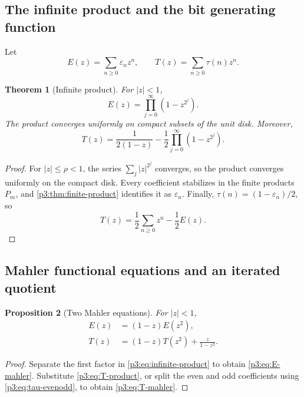 \documentclass[11pt,oneside]{article}
\newtheorem{theorem}{Theorem}[section]
\newtheorem{proposition}[theorem]{Proposition}
\theoremstyle{definition}
\theoremstyle{remark}
\newcommand{\eps}{\varepsilon}
\newcommand{\1}{\mathbf 1}
\begin{document}
\subsection{The infinite product and the bit generating function}

Let
\begin{equation}
 E(z)=\sum_{n\ge0}\eps_nz^n,
 \qquad
 T(z)=\sum_{n\ge0}\tau(n)z^n.
 \label{p3:eq:E-T-def}
\end{equation}

\begin{theorem}[Infinite product]
\label{p3:thm:infinite-product}
For \(|z|<1\),
\begin{equation}
 \boxed{
 E(z)=\prod_{j=0}^{\infty}(1-z^{2^j}).}
 \label{p3:eq:infinite-product}
\end{equation}
The product converges uniformly on compact subsets of the unit disk.  Moreover,
\begin{equation}
 \boxed{
 T(z)=\frac{1}{2(1-z)}-\frac12\prod_{j=0}^{\infty}(1-z^{2^j}).}
 \label{p3:eq:T-product}
\end{equation}
\end{theorem}

\begin{proof}
For \(|z|\le\rho<1\), the series \(\sum_j|z|^{2^j}\) converges, so the product converges
uniformly on the compact disk.  Every coefficient stabilizes in the finite products
\(P_m\), and \cref{p3:thm:finite-product} identifies it as \(\eps_n\).  Finally,
\(\tau(n)=(1-\eps_n)/2\), so
\[
 T(z)=\frac12\sum_{n\ge0}z^n-\frac12E(z).
\]
\end{proof}

\subsection{Mahler functional equations and an iterated quotient}

\begin{proposition}[Two Mahler equations]
\label{p3:prop:mahler}
For \(|z|<1\),
\begin{align}
 E(z)&=(1-z)E(z^2),                                      \label{p3:eq:E-mahler}\\
 T(z)&=(1-z)T(z^2)+\frac{z}{1-z^2}.                      \label{p3:eq:T-mahler}
\end{align}
\end{proposition}

\begin{proof}
Separate the first factor in \eqref{p3:eq:infinite-product} to obtain
\eqref{p3:eq:E-mahler}.  Substitute \eqref{p3:eq:T-product}, or split the even and odd
coefficients using \eqref{p3:eq:tau-evenodd}, to obtain \eqref{p3:eq:T-mahler}.
\end{proof}
\end{document}
